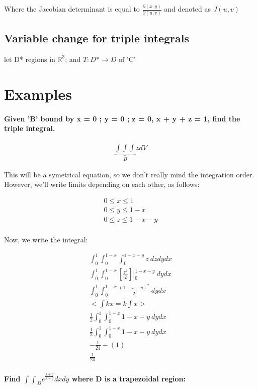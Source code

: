 \documentclass[11pt,fleqn]{book} %
\begin{document}
Where the Jacobian determinant is equal to $\frac{\partial(x,y)}{\partial(u,v)}$ and denoted as $ J(u,v) $

\subsection{Variable change for triple integrals}

let D* regions in $\mathbb{R}^3$; and $T: D* \to D$ of 'C' 


\section{Examples}
\paragraph{Given 'B' bound by x = 0 ; y = 0 ; z = 0, x + y + z = 1, find the triple integral.}
\begin{gather}
    \underbrace{\int\int\int}_{B} z dV
\end{gather}

This will be a symetrical equation, so we don't really mind the integration order. However, we'll write
limits depending on each other, as follows:

\begin{gather}
    0 \leq x \leq 1 \\
    0 \leq y \leq 1-x\\
    0 \leq z \leq 1-x-y\\
\end{gather}

Now, we write the integral:

\begin{gather}
    \int_0^1 \int_0^{1-x} \int_0^{1-x-y} z \ dz dy dx\\
    \int_0^1 \int_0^{1-x} [\frac{z^2}{2}]|_0^{1-x-y} \ dy dx \\
    \int_0^1 \int_0^{1-x} \frac{(1-x-y)^2}{2} \ dy dx \\
    < \int kx = k \int x >\\
    \frac{1}{2} \int_0^1 \int_0^{1-x} 1-x-y \ dy dx \\
    \frac{1}{2} \int_0^1 \int_0^{1-x} 1-x-y \ dy dx \\
    - \frac{1}{24} - (1)\\
    \frac{1}{24}
\end{gather}

\paragraph{Find ${\int\int}_D e^{\frac{x+y}{x-y}} dxdy$ where D is a trapezoidal region:}
\end{document}
